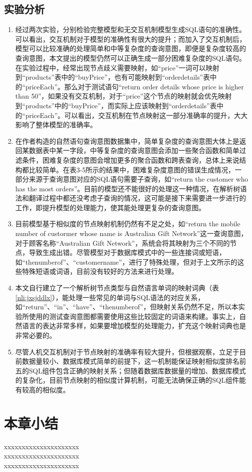 \subsection{实验分析}
\begin{enumerate}
    \item   经过两次实验，分别检验完整模型和无交互机制模型生成SQL语句的准确性。可以看出，交互机制对于模型的准确性有很大的提升；而加入了交互机制后，模型可以比较准确的处理简单和中等复杂度的查询意图，即便是复杂度较高的查询意图，本文提出的模型仍然可以正确生成一部分困难复杂度的SQL语句。在实验过程中，经常出现节点歧义需要映射，如“price”一词可以映射到“products”表中的“buyPrice”，也有可能映射到“orderdetails”表中的“priceEach”。那么对于测试语句“return order details whose price is higher than 50”，如果没有交互机制，对于“price”这个节点的映射就会优先映射到“products”中的“buyPrice”，而实际上应该映射到“orderdetails”表中的“priceEach”。可以看出，交互机制在节点映射这一部分准确率的提升，大大影响了整体模型的准确率。
    \item	在作者构造的自然语句查询意图数据集中，简单复杂度的查询意图大体上是返回某数据表中某一字段，中等复杂度的查询意图会添加一些聚合函数和简单过滤条件，困难复杂度的意图会增加更多的聚合函数和跨表查询，总体上来说结构都比较简单。在表3-5所示的结果中，困难复杂度意图的错误生成情况，一部分来源于查询意图对应的SQL语句需要子查询，如“return the customer who has the most orders”。目前的模型还不能很好的处理这一种情况，在解析树语法和翻译过程中都还没考虑子查询的情况，这可能是接下来需要进一步进行的工作，即提升模型的处理能力，使其能处理更复杂的查询意图。
    \item	目前模型基于相似度的节点映射机制仍然有不足之处，如“return the mobile number of custormer whose name is Australian Gift Network”这一查询意图，对于顾客名称“Australian Gift Network”，系统会将其映射为三个不同的节点，导致生成出错。尽管模型对于数据库模式中的一些连接词或短语，如“thenumberof”、“customername”，进行了特殊处理，但对于上文所示的这些特殊短语或词语，目前没有较好的方法来进行处理。
    \item	本文自行建立了一个解析树节点类型与自然语言单词的映射词典（表\ref{nli:jxsjddlx}），能处理一些常见的单词与SQL语法的对应关系，如“return”、“in”、“have”、“thenumberof”，但映射关系仍然不足，所以本实验所使用的测试查询意图都需要使用这些比较固定的词语来构建。事实上，自然语言的表达非常多样，如果要增加模型的处理能力，扩充这个映射词典也是非常必要的。
    \item	尽管人机交互机制对于节点映射的准确率有较大提升，但根据观察，立足于目前数据量较小、数据库模式简单的前提下，这一机制能保证映射相似度排名前五的SQL组件包含正确的映射关系；但随着数据库数据量的增加、数据库模式的复杂化，目前节点映射的相似度计算机制，可能无法确保正确的SQL组件能有较高的相似度。
\end{enumerate}


\section{本章小结}
    xxxxxxxxxxxxxxxxxxxxx\\
    xxxxxxxxxxxxxxxxxxxxx\\
    xxxxxxxxxxxxxxxxxxxxx



